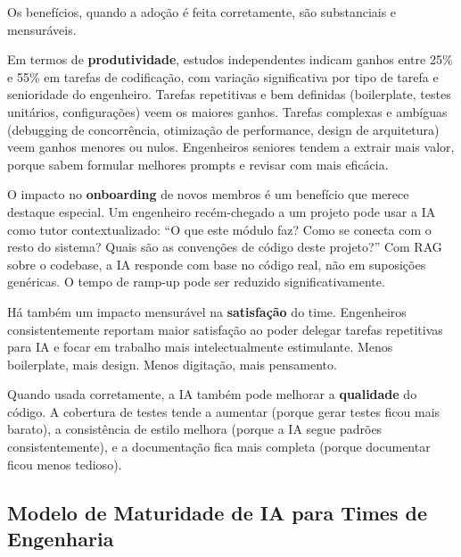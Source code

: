 Os benefícios, quando a adoção é feita corretamente, são substanciais e mensuráveis.

Em termos de \textbf{produtividade}, estudos independentes indicam ganhos entre 25\% e
55\% em tarefas de codificação, com variação significativa por tipo de tarefa e
senioridade do engenheiro. Tarefas repetitivas e bem definidas (boilerplate, testes
unitários, configurações) veem os maiores ganhos. Tarefas complexas e ambíguas
(debugging de concorrência, otimização de performance, design de arquitetura) veem
ganhos menores ou nulos. Engenheiros seniores tendem a extrair mais valor, porque
sabem formular melhores prompts e revisar com mais eficácia.

O impacto no \textbf{onboarding} de novos membros é um benefício que merece destaque
especial. Um engenheiro recém-chegado a um projeto pode usar a IA como tutor
contextualizado: ``O que este módulo faz? Como se conecta com o resto do sistema?
Quais são as convenções de código deste projeto?'' Com RAG sobre o codebase, a IA
responde com base no código real, não em suposições genéricas. O tempo de ramp-up
pode ser reduzido significativamente.

Há também um impacto mensurável na \textbf{satisfação} do time. Engenheiros
consistentemente reportam maior satisfação ao poder delegar tarefas repetitivas para
IA e focar em trabalho mais intelectualmente estimulante. Menos boilerplate, mais
design. Menos digitação, mais pensamento.

Quando usada corretamente, a IA também pode melhorar a \textbf{qualidade} do código.
A cobertura de testes tende a aumentar (porque gerar testes ficou mais barato), a
consistência de estilo melhora (porque a IA segue padrões consistentemente), e a
documentação fica mais completa (porque documentar ficou menos tedioso).

\subsection{Modelo de Maturidade de IA para Times de Engenharia}

